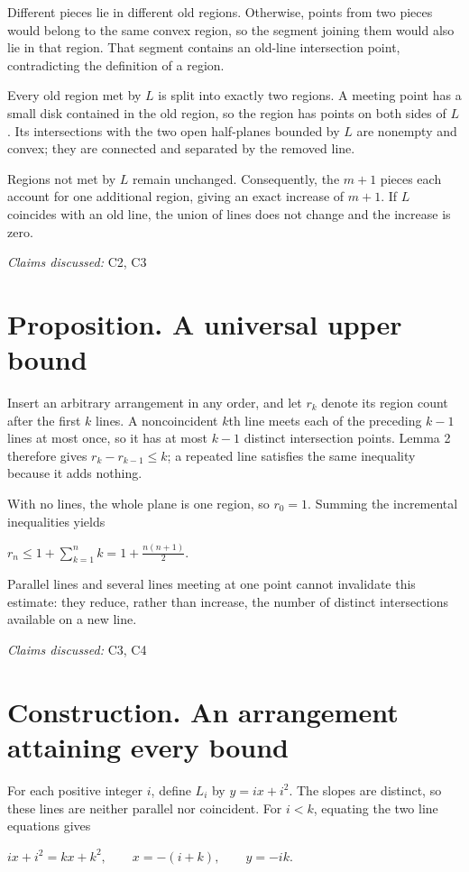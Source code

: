 \documentclass[11pt]{article}
\begin{document}
Different pieces lie in different old regions. Otherwise, points from two pieces would belong to the same convex region, so the segment joining them would also lie in that region. That segment contains an old-line intersection point, contradicting the definition of a region.

Every old region met by $L$ is split into exactly two regions. A meeting point has a small disk contained in the old region, so the region has points on both sides of $L$. Its intersections with the two open half-planes bounded by $L$ are nonempty and convex; they are connected and separated by the removed line.

Regions not met by $L$ remain unchanged. Consequently, the $m+1$ pieces each account for one additional region, giving an exact increase of $m+1$. If $L$ coincides with an old line, the union of lines does not change and the increase is zero.

\textit{Claims discussed: }C2, C3
\section{Proposition. A universal upper bound}
Insert an arbitrary arrangement in any order, and let $r_k$ denote its region count after the first $k$ lines. A noncoincident $k$th line meets each of the preceding $k-1$ lines at most once, so it has at most $k-1$ distinct intersection points. Lemma 2 therefore gives $r_k-r_{k-1}\leq k$; a repeated line satisfies the same inequality because it adds nothing.

With no lines, the whole plane is one region, so $r_0=1$. Summing the incremental inequalities yields

$r_n\leq 1+\sum_{k=1}^{n}k=1+\frac{n(n+1)}{2}.$

Parallel lines and several lines meeting at one point cannot invalidate this estimate: they reduce, rather than increase, the number of distinct intersections available on a new line.

\textit{Claims discussed: }C3, C4
\section{Construction. An arrangement attaining every bound}
For each positive integer $i$, define $L_i$ by $y=ix+i^2$. The slopes are distinct, so these lines are neither parallel nor coincident. For $i<k$, equating the two line equations gives

$ix+i^2=kx+k^2,\qquad x=-(i+k),\qquad y=-ik.$
\end{document}
